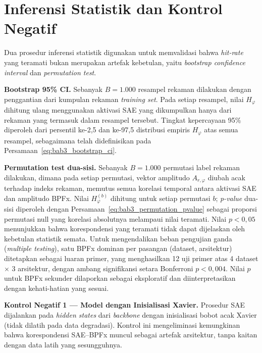 \section{Inferensi Statistik dan Kontrol Negatif}
\label{sec:bab5_inferensi}

Dua prosedur inferensi statistik digunakan untuk memvalidasi bahwa
\emph{hit-rate} yang teramati bukan merupakan artefak kebetulan, yaitu \emph{bootstrap
confidence interval} dan \emph{permutation test}.

\textbf{Bootstrap 95\% CI.} Sebanyak $B = 1.000$ resampel rekaman dilakukan
dengan penggantian dari kumpulan rekaman \emph{training set}. Pada setiap
resampel, nilai $H_\varphi$ dihitung ulang menggunakan aktivasi SAE yang
dikumpulkan hanya dari rekaman yang termasuk dalam resampel tersebut.
Tingkat kepercayaan 95\% diperoleh dari persentil ke-2,5 dan ke-97,5 distribusi
empiris $H_\varphi$ atas semua resampel, sebagaimana telah didefinisikan pada
Persamaan~\ref{eq:bab3_bootstrap_ci}.

\textbf{Permutation test{\color{blue} dua-sisi}.} Sebanyak $B = 1.000$
permutasi label rekaman dilakukan, dimana pada setiap permutasi, vektor amplitudo
$A_{r,\varphi}$ diubah acak terhadap indeks rekaman, memutus semua korelasi
temporal antara aktivasi SAE dan amplitudo BPFx.
Nilai $H_\varphi^{(b)}$ dihitung untuk setiap permutasi $b$; \emph{p-value}
{\color{blue}dua-sisi} diperoleh dengan
Persamaan~\ref{eq:bab3_permutation_pvalue} {\color{blue}sebagai proporsi
permutasi null yang korelasi absolutnya melampaui nilai teramati}.
Nilai $p < 0{,}05$ menunjukkan bahwa korespondensi yang teramati tidak dapat
dijelaskan oleh kebetulan statistik semata.
{\color{blue}Untuk mengendalikan beban pengujian ganda (\emph{multiple
testing}), satu BPFx dominan per pasangan (dataset, arsitektur) ditetapkan
sebagai luaran primer, yang menghasilkan 12 uji primer atas 4 dataset $\times$
3 arsitektur, dengan ambang signifikansi setara Bonferroni $p < 0{,}004$.
Nilai $p$ untuk BPFx sekunder dilaporkan sebagai eksploratif dan
diinterpretasikan dengan kehati-hatian yang sesuai.}

\textbf{Kontrol Negatif 1 --- Model dengan Inisialisasi Xavier.} Prosedur
SAE dijalankan pada \emph{hidden states} dari \emph{backbone} dengan
inisialisasi bobot acak Xavier (tidak dilatih pada data degradasi).
Kontrol ini mengeliminasi kemungkinan bahwa korespondensi SAE--BPFx muncul
sebagai artefak arsitektur, tanpa kaitan dengan data latih yang sesungguhnya.

